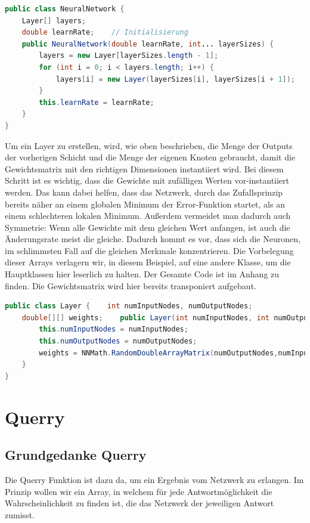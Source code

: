 \documentclass[12pt]{article}
\begin{document}
\begin{lstlisting}[language=Java]
public class NeuralNetwork {
    Layer[] layers;
    double learnRate;    // Initialisierung
    public NeuralNetwork(double learnRate, int... layerSizes) {
        layers = new Layer[layerSizes.length - 1];
        for (int i = 0; i < layers.length; i++) {
            layers[i] = new Layer(layerSizes[i], layerSizes[i + 1]);
        }
        this.learnRate = learnRate;
    }
}
\end{lstlisting}Um ein Layer zu erstellen, wird, wie oben beschrieben, die Menge der Outputs der vorherigen Schicht und die Menge der eigenen Knoten gebraucht, damit die Gewichtsmatrix mit den richtigen Dimensionen instantiiert wird. Bei diesem Schritt ist es wichtig, dass die Gewichte mit zufälligen Werten vor-instantiiert werden. Das kann dabei helfen, dass das Netzwerk, durch das Zufallsprinzip bereits näher an einem globalen Minimum der Error-Funktion startet, als an einem schlechteren lokalen Minimum. Außerdem vermeidet man dadurch auch Symmetrie: Wenn alle Gewichte mit dem gleichen Wert anfangen, ist auch die Änderungsrate meist die gleiche. Dadurch kommt es vor, dass sich die Neuronen, im schlimmsten Fall auf die gleichen Merkmale konzentrieren. Die Vorbelegung dieser Arrays verlagern wir, in diesem Beispiel, auf eine andere Klasse, um die Hauptklassen hier leserlich zu halten. Der Gesamte Code ist im Anhang zu finden. Die Gewichtsmatrix wird hier bereits transponiert aufgebaut.\begin{lstlisting}[language=Java]
public class Layer {    int numInputNodes, numOutputNodes;
    double[][] weights;    public Layer(int numInputNodes, int numOutputNodes) {
        this.numInputNodes = numInputNodes;
        this.numOutputNodes = numOutputNodes;
        weights = NNMath.RandomDoubleArrayMatrix(numOutputNodes,numInputNodes);
    }
}
\end{lstlisting}\section{Querry}\subsection{Grundgedanke Querry}Die Querry Funktion ist dazu da, um ein Ergebnis vom Netzwerk zu erlangen. Im Prinzip wollen wir ein Array, in welchem für jede Antwortmöglichkeit die Wahrscheinlichkeit zu finden ist, die das Netzwerk der jeweiligen Antwort zumisst. 
\end{document}
